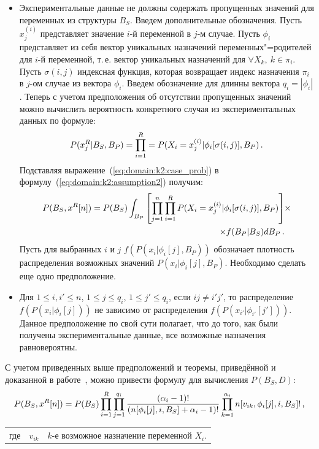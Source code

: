 \begin{itemize}
  \item
  Экспериментальные данные не должны содержать пропущенных значений для переменных из структуры $B_S$. 
  Введем дополнительные обозначения.
  Пусть $x_j^{(i)}$ представляет значение $i$-й переменной в $j$-м случае.
  Пусть $\phi_i$ представляет из себя вектор уникальных назначений переменных"=родителей для $i$-й переменной, т.\,е. вектор уникальных назначений для $ \forall X_k,\ k \in \pi_i$.
  Пусть $\sigma(i, j)$ индексная функция, которая возвращает индекс назначения $\pi_i$ в $j$-ом случае из вектора $\phi_i$.
  Введем обозначение для длинны вектора $q_i = | \phi_i |$.
  Теперь с учетом предположения об отсутствии пропущенных значений можно вычислить вероятность конкретного случая из экспериментальных данных по формуле:
  \begin{equation}
    \label{eq:domain:k2:case_prob}
    P(x^R_j | B_S, B_P) = 
      \prod_{i = 1}^{R} = P(X_i = x_j^{(i)} | \phi_i[\sigma(i, j)], B_P) \text{\,.}
  \end{equation}
  Подставляя выражение~(\ref{eq:domain:k2:case_prob}) в формулу~(\ref{eq:domain:k2:assumption2}) получим:
  \begin{align}
    \label{eq:domain:k2:assumption3}
    P(B_S, x^R[n]) =
      P(B_S)
      \int_{B_P}\left[ \prod_{j = 1}^{n}\prod_{i = 1}^{R} P(X_i = x_j^{(i)} | \phi_i[\sigma(i, j)], B_P)  \right] &\times \notag\\ 
      \times f(B_P | B_S) dB_P \text{\,.}
  \end{align}
  Пусть для выбранных $i$ и $j$ $f(P(x_i | \phi_i[j], B_P))$ обозначает плотность распределения возможных значений $P(x_i | \phi_i[j], B_P)$.
  Необходимо сделать еще одно предположение.

  \item Для $ 1 \le i, i' \le n$, $ 1 \le j \le q_i $, $1 \le j' \le q_i $, если 
  $ij \neq i'j'$, то распределение $f(P(x_i | \phi_i[j]))$ не зависимо от распределения $f(P(x_{i'} | \phi_{i'}[{j'}]))$.
  Данное предположение по свой сути полагает, что до того, как были получены экспериментальные данные, все возможные назначения равновероятны.
\end{itemize}

С учетом приведенных выше предположений и теоремы, приведённой и доказанной в работе~\cite{Cooper1991}, можно привести формулу для вычисления $P(B_S, D)$:
\begin{equation}
  \label{eq:domain:k2:model_and_data_prob}
  P(B_S, x^R[n]) = 
    P(B_S)
    \prod_{i = 1}^{R}
    \prod_{j = 1}^{q_i}
    \frac{(\alpha_i - 1)!}
         {(n[\phi_i[j], i, B_S] + \alpha_i - 1)!}
    \prod_{k = 1}^{\alpha_i}
      n[v_{ik}, \phi_i[j], i, B_S]! \text{\,,}
\end{equation}
\par
\begin{tabular}{@{}ll@{ --- }p{}}
где & $ v_{ik} $ & $k$-е возможное назначение переменной $X_i$. \\[\parsep]
\end{tabular}

